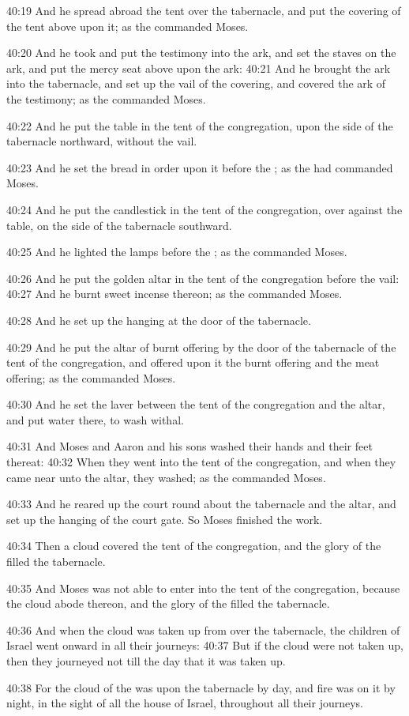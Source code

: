 40:19 And he spread abroad the tent over the tabernacle, and put the covering of the tent above upon it; as the \LORD commanded Moses.

40:20 And he took and put the testimony into the ark, and set the staves on the ark, and put the mercy seat above upon the ark: 40:21 And he brought the ark into the tabernacle, and set up the vail of the covering, and covered the ark of the testimony; as the \LORD commanded Moses.

40:22 And he put the table in the tent of the congregation, upon the side of the tabernacle northward, without the vail.

40:23 And he set the bread in order upon it before the \LORD; as the \LORD had commanded Moses.

40:24 And he put the candlestick in the tent of the congregation, over against the table, on the side of the tabernacle southward.

40:25 And he lighted the lamps before the \LORD; as the \LORD commanded Moses.

40:26 And he put the golden altar in the tent of the congregation before the vail: 40:27 And he burnt sweet incense thereon; as the \LORD commanded Moses.

40:28 And he set up the hanging at the door of the tabernacle.

40:29 And he put the altar of burnt offering by the door of the tabernacle of the tent of the congregation, and offered upon it the burnt offering and the meat offering; as the \LORD commanded Moses.

40:30 And he set the laver between the tent of the congregation and the altar, and put water there, to wash withal.

40:31 And Moses and Aaron and his sons washed their hands and their feet thereat: 40:32 When they went into the tent of the congregation, and when they came near unto the altar, they washed; as the \LORD commanded Moses.

40:33 And he reared up the court round about the tabernacle and the altar, and set up the hanging of the court gate. So Moses finished the work.

40:34 Then a cloud covered the tent of the congregation, and the glory of the \LORD filled the tabernacle.

40:35 And Moses was not able to enter into the tent of the congregation, because the cloud abode thereon, and the glory of the \LORD filled the tabernacle.

40:36 And when the cloud was taken up from over the tabernacle, the children of Israel went onward in all their journeys: 40:37 But if the cloud were not taken up, then they journeyed not till the day that it was taken up.

40:38 For the cloud of the \LORD was upon the tabernacle by day, and fire was on it by night, in the sight of all the house of Israel, throughout all their journeys.

